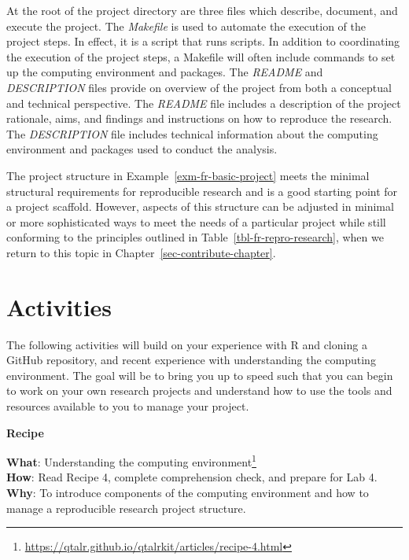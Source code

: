 \documentclass[
  letterpaper,
]{latex/krantz}
\theoremstyle{definition}
\theoremstyle{remark}
\DeclareRobustCommand{\href}[2]{#2\footnote{\url{#1}}}
\begin{document}
At the root of the project directory are three files which describe,
document, and execute the project. The \emph{Makefile} is used to
automate the execution of the project steps. In effect, it is a script
that runs scripts. In addition to coordinating the execution of the
project steps, a Makefile will often include commands to set up the
computing environment and packages. The \emph{README} and
\emph{DESCRIPTION} files provide on overview of the project from both a
conceptual and technical perspective. The \emph{README} file includes a
description of the project rationale, aims, and findings and
instructions on how to reproduce the research. The \emph{DESCRIPTION}
file includes technical information about the computing environment and
packages used to conduct the analysis.

The project structure in Example~\ref{exm-fr-basic-project} meets the
minimal structural requirements for reproducible research and is a good
starting point for a project scaffold. However, aspects of this
structure can be adjusted in minimal or more sophisticated ways to meet
the needs of a particular project while still conforming to the
principles outlined in Table~\ref{tbl-fr-repro-research}, when we return
to this topic in Chapter~\ref{sec-contribute-chapter}.

\section*{Activities}\label{activities-2}


The following activities will build on your experience with R and
cloning a GitHub repository, and recent experience with understanding
the computing environment. The goal will be to bring you up to speed
such that you can begin to work on your own research projects and
understand how to use the tools and resources available to you to manage
your project.

\begin{tcolorbox}[enhanced jigsaw, toprule=.15mm, breakable, colback=white, opacityback=0, leftrule=.75mm, bottomrule=.15mm, colframe=quarto-callout-color-frame, left=2mm, arc=.35mm, rightrule=.15mm]

\textbf{ Recipe}

\textbf{What}:
\href{https://qtalr.github.io/qtalrkit/articles/recipe-4.html}{Understanding
the computing environment}\\
\textbf{How}: Read Recipe 4, complete comprehension check, and prepare
for Lab 4.\\
\textbf{Why}: To introduce components of the computing environment and
how to manage a reproducible research project structure.

\end{tcolorbox}
\end{document}
